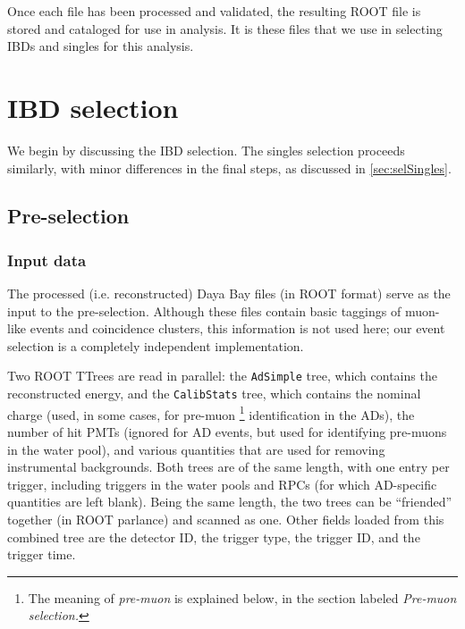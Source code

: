 \documentclass[../thesis.tex]{subfiles}
\begin{document}
Once each file has been processed and validated, the resulting ROOT file is stored and cataloged for use in analysis. It is these files that we use in selecting IBDs and singles for this analysis.

\section{IBD selection}
\label{sec:selIBDs}

We begin by discussing the IBD selection. The singles selection proceeds similarly, with minor differences in the final steps, as discussed in \autoref{sec:selSingles}.

\subsection{Pre-selection}
\label{sec:selPreSel}

\subsubsection{Input data}
\label{sec:selInputData}

The processed (i.e. reconstructed) Daya Bay files (in ROOT format) serve as the input to the pre-selection. Although these files contain basic taggings of muon-like events and coincidence clusters, this information is not used here; our event selection is a completely independent implementation.

Two ROOT TTrees are read in parallel: the \texttt{AdSimple} tree, which contains the reconstructed energy, and the \texttt{CalibStats} tree, which contains the nominal charge (used, in some cases, for pre-muon%
\footnote{The meaning of \emph{pre-muon} is explained below, in the section labeled \emph{Pre-muon selection.}}
identification in the ADs), the number of hit PMTs (ignored for AD events, but used for identifying pre-muons in the water pool), and various quantities that are used for removing instrumental backgrounds. Both trees are of the same length, with one entry per trigger, including triggers in the water pools and RPCs (for which AD-specific quantities are left blank). Being the same length, the two trees can be ``friended'' together (in ROOT parlance) and scanned as one. Other fields loaded from this combined tree are the detector ID, the trigger type, the trigger ID, and the trigger time.
\end{document}
